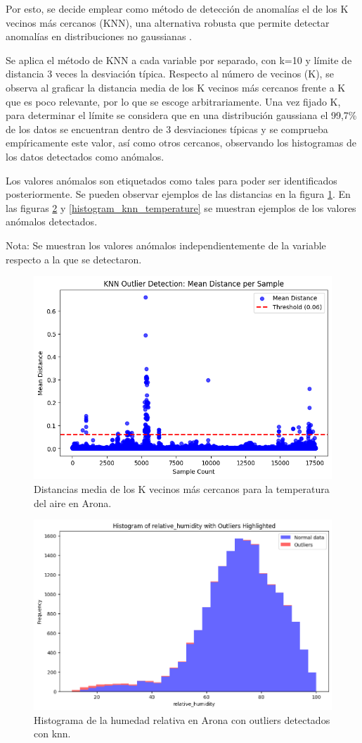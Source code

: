 Por esto, se decide emplear como método de detección de anomalías el de los K vecinos más cercanos (KNN), 
una alternativa robusta que permite detectar anomalías en distribuciones no gaussianas \cite{gu2019}.

Se aplica el método de KNN a cada variable por separado, con k=10 y límite de distancia 3 veces la desviación típica.
Respecto al número de vecinos (K), se observa al graficar la distancia media de los K vecinos más cercanos frente a K que es poco relevante, por lo que se escoge arbitrariamente.
Una vez fijado K, para determinar el límite se considera que en una distribución gaussiana el 99,7\% de los datos se encuentran dentro de 3 desviaciones típicas y se comprueba empíricamente
este valor, así como otros cercanos, observando los histogramas de los datos detectados como anómalos.

Los valores anómalos son etiquetados como tales para poder ser identificados posteriormente. Se pueden observar ejemplos 
de las distancias en la figura \ref{knn_distances}. En las figuras \ref{histogram_knn_humidity} y \ref{histogram_knn_temperature} se muestran ejemplos de los valores anómalos detectados. 

Nota: Se muestran los valores anómalos independientemente de la variable respecto a la que se detectaron.

\begin{figure}
    \centering
    \includegraphics[width=.5\linewidth]{images/knn_distances_temperature_arona.png}
    \caption{Distancias media de los K vecinos más cercanos para la temperatura del aire en Arona.}
    \label{knn_distances}
\end{figure}

\begin{figure}
    \centering
    \includegraphics[width=.5\linewidth]{images/histogram_humidity_knn.png}
    \caption{Histograma de la humedad relativa en Arona con outliers detectados con knn.}
    \label{histogram_knn_humidity}
\end{figure}

